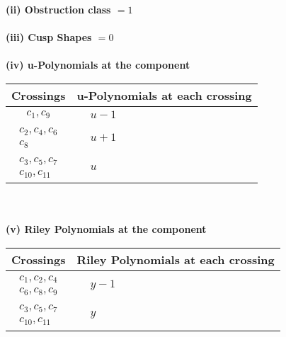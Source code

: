 \documentclass[1p]{elsarticle_modified}
\theoremstyle{definition}
\begin{document}
\flushleft \textbf{(ii) Obstruction class $= 1$}\\~\\
\flushleft \textbf{(iii) Cusp Shapes $= 0$}\\~\\
\newpage\renewcommand{\arraystretch}{1}
\flushleft \textbf{(iv) u-Polynomials at the component}\newline \\
\begin{tabular}{m{50pt}|m{274pt}}
Crossings & \hspace{64pt}u-Polynomials at each crossing \\
\hline $$\begin{aligned}c_{1},c_{9}\end{aligned}$$&$\begin{aligned}
&u-1
\end{aligned}$\\
\hline $$\begin{aligned}c_{2},c_{4},c_{6}\\c_{8}\end{aligned}$$&$\begin{aligned}
&u+1
\end{aligned}$\\
\hline $$\begin{aligned}c_{3},c_{5},c_{7}\\c_{10},c_{11}\end{aligned}$$&$\begin{aligned}
&u
\end{aligned}$\\
\hline
\end{tabular}\\~\\
\newpage\renewcommand{\arraystretch}{1}
\flushleft \textbf{(v) Riley Polynomials at the component}\newline \\
\begin{tabular}{m{50pt}|m{274pt}}
Crossings & \hspace{64pt}Riley Polynomials at each crossing \\
\hline $$\begin{aligned}c_{1},c_{2},c_{4}\\c_{6},c_{8},c_{9}\end{aligned}$$&$\begin{aligned}
&y-1
\end{aligned}$\\
\hline $$\begin{aligned}c_{3},c_{5},c_{7}\\c_{10},c_{11}\end{aligned}$$&$\begin{aligned}
&y
\end{aligned}$\\
\hline
\end{tabular}\\~\\
\end{document}
